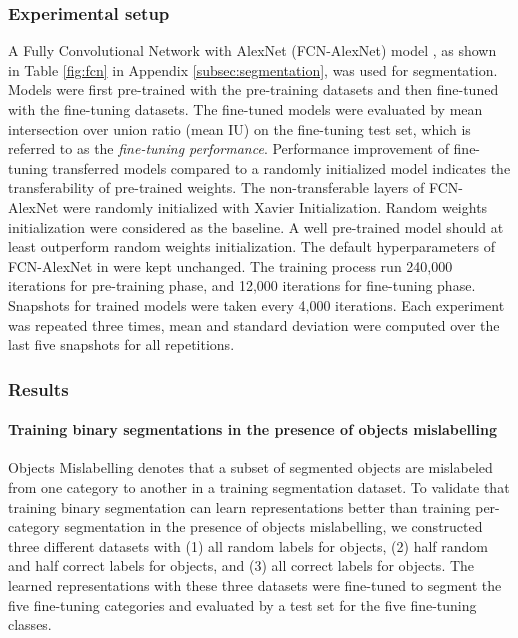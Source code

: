 \subsubsection{Experimental setup}
\label{subsubsec:ptft}
A Fully Convolutional Network with AlexNet (FCN-AlexNet) model \cite{long2015fully}, as shown in Table \ref{fig:fcn} in Appendix \ref{subsec:segmentation}, was used for segmentation.
Models were first pre-trained with the pre-training datasets and then fine-tuned with the fine-tuning datasets.
The fine-tuned models were evaluated by mean intersection over union ratio (mean IU) on the fine-tuning test set, which is referred to as the \textit{fine-tuning performance}.
Performance improvement of fine-tuning transferred models compared to a randomly initialized model indicates the transferability of pre-trained weights.
The non-transferable layers of FCN-AlexNet were randomly initialized with Xavier Initialization.
Random weights initialization were considered as the baseline.
A well pre-trained model should at least outperform random weights initialization.
The default hyperparameters of FCN-AlexNet in  \cite{long2015fully} were kept unchanged.
The training process run 240,000 iterations for pre-training phase, and 12,000 iterations for fine-tuning phase.
Snapshots for trained models were taken every 4,000 iterations.
Each experiment was repeated three times, mean and standard deviation were computed over the last five snapshots for all repetitions.



\subsubsection{Results}



\paragraph{Training binary segmentations in the presence of objects mislabelling}
Objects Mislabelling denotes that a subset of segmented objects are mislabeled from one category to another in a training segmentation dataset.
To validate that training binary segmentation can learn representations better than training per-category segmentation in the presence of objects mislabelling, we constructed three different datasets with (1) all random labels for objects, (2) half random and half correct labels for objects, and (3) all correct labels for objects.
The learned representations with these three datasets were fine-tuned to segment the five fine-tuning categories and evaluated by a test set for the five fine-tuning classes.

